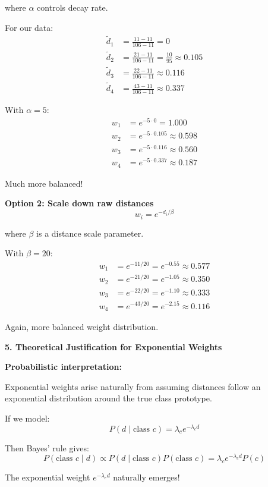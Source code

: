 \documentclass[12pt]{article}
\begin{document}
\begin{explanation}
where \(\alpha\) controls decay rate.

For our data:
\begin{align*}
\tilde{d}_1 &= \frac{11 - 11}{106 - 11} = 0 \\
\tilde{d}_2 &= \frac{21 - 11}{106 - 11} = \frac{10}{95} \approx 0.105 \\
\tilde{d}_3 &= \frac{22 - 11}{106 - 11} \approx 0.116 \\
\tilde{d}_4 &= \frac{43 - 11}{106 - 11} \approx 0.337
\end{align*}

With \(\alpha = 5\):
\begin{align*}
w_1 &= e^{-5 \cdot 0} = 1.000 \\
w_2 &= e^{-5 \cdot 0.105} \approx 0.598 \\
w_3 &= e^{-5 \cdot 0.116} \approx 0.560 \\
w_4 &= e^{-5 \cdot 0.337} \approx 0.187
\end{align*}

Much more balanced!

\textbf{Option 2: Scale down raw distances}
\[
w_i = e^{-d_i / \beta}
\]

where \(\beta\) is a distance scale parameter.

With \(\beta = 20\):
\begin{align*}
w_1 &= e^{-11/20} = e^{-0.55} \approx 0.577 \\
w_2 &= e^{-21/20} = e^{-1.05} \approx 0.350 \\
w_3 &= e^{-22/20} = e^{-1.10} \approx 0.333 \\
w_4 &= e^{-43/20} = e^{-2.15} \approx 0.116
\end{align*}

Again, more balanced weight distribution.

\textbf{5. Theoretical Justification for Exponential Weights}

\textbf{Probabilistic interpretation:}

Exponential weights arise naturally from assuming distances follow an exponential distribution around the true class prototype.

If we model:
\[
P(d \mid \text{class } c) = \lambda_c e^{-\lambda_c d}
\]

Then Bayes' rule gives:
\[
P(\text{class } c \mid d) \propto P(d \mid \text{class } c) P(\text{class } c) = \lambda_c e^{-\lambda_c d} P(c)
\]

The exponential weight \(e^{-\lambda_c d}\) naturally emerges!


\end{explanation}
\end{document}
